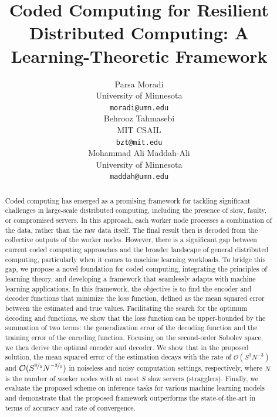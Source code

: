 \documentclass{article}
\title{Coded Computing for Resilient Distributed Computing: A Learning-Theoretic Framework}
\author{%
  Parsa Moradi \\
  University of Minnesota\\
  \texttt{moradi@umn.edu} \\
  \And
  Behrooz Tahmasebi \\
  MIT CSAIL \\
  \texttt{bzt@mit.edu} \\
  \And
  Mohammad Ali Maddah-Ali \\
  University of Minnesota \\
  \texttt{maddah@umn.edu} \\
}
\begin{document}
\maketitle

\begin{abstract}
Coded computing has emerged as a promising framework for tackling significant challenges in large-scale distributed computing, including the presence of slow, faulty, or compromised servers. In this approach, each worker node processes a combination of the data, rather than the raw data itself. The final result then is decoded from the collective outputs of the worker nodes.  However, there is a significant gap between current coded computing approaches and the broader landscape of general distributed computing, particularly when it comes to machine learning workloads. To bridge this gap, we propose a novel foundation for coded computing, integrating the principles of learning theory, and developing a framework that seamlessly adapts with machine learning applications. 
In this framework, the objective is to find the encoder and decoder functions that minimize the loss function, defined as the mean squared error between the estimated and true values. Facilitating the search for the optimum decoding and functions, we show that the loss function can be upper-bounded by the summation of two terms: the generalization error of the decoding function and the training error of the encoding function. 
Focusing on 
the second-order Sobolev space, we then derive the optimal encoder and decoder. We show that in the proposed solution, the mean squared error of the estimation decays with the rate of $\mathcal{O}(S^3 N^{-3})$ and $\mathcal{O}(S^{\nicefrac{8}{5}}N^{\nicefrac{-3}{5}})$ in noiseless and noisy computation settings, respectively, where $N$ is the number of worker nodes with at most $S$ slow servers (stragglers). Finally, we evaluate the proposed scheme on inference tasks for various machine learning models and demonstrate that the proposed framework outperforms the state-of-the-art in terms of accuracy and rate of convergence. 
\end{abstract}
\end{document}

